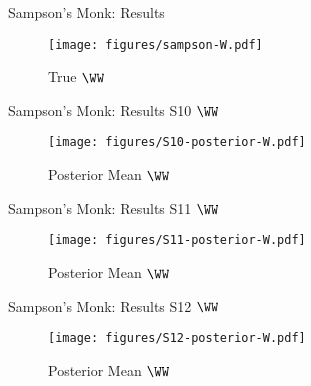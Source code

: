 \documentclass{beamer}
\begin{document}
\begin{frame}{Sampson's Monk: Results}
	\begin{figure}[H]
		\centering
		\texttt{[image: figures/sampson-W.pdf]}
		\caption{True $\WW$}
	\end{figure}
\end{frame}

\begin{frame}{Sampson's Monk: Results S10 $\WW$}
	\begin{figure}[H]
		\centering
		\texttt{[image: figures/S10-posterior-W.pdf]}
		\caption{Posterior Mean $\WW$}
	\end{figure}
\end{frame}

\begin{frame}{Sampson's Monk: Results S11 $\WW$}
	\begin{figure}[H]
		\centering
		\texttt{[image: figures/S11-posterior-W.pdf]}
		\caption{Posterior Mean $\WW$}
	\end{figure}
\end{frame}

\begin{frame}{Sampson's Monk: Results S12 $\WW$}
	\begin{figure}[H]
		\centering
		\texttt{[image: figures/S12-posterior-W.pdf]}
		\caption{Posterior Mean $\WW$}
	\end{figure}
\end{frame}
\end{document}
